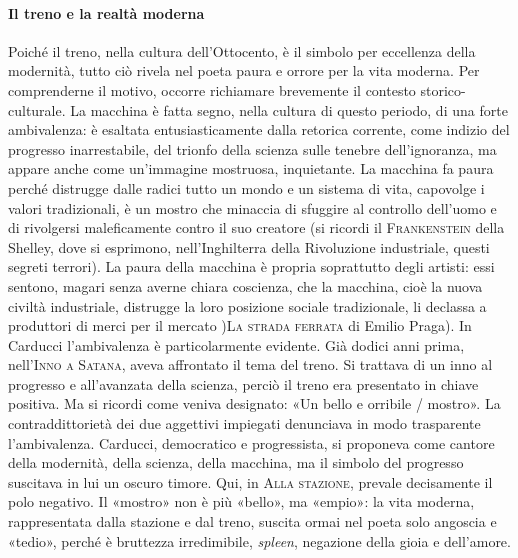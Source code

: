 \documentclass{book}
\newcounter{mar}
\begin{document}
\paragraph{Il treno e la realtà moderna} Poiché il treno, nella cultura dell'Ottocento, è il simbolo per eccellenza della modernità, tutto ciò rivela nel poeta paura e orrore per la vita moderna. Per comprenderne il motivo, occorre richiamare brevemente il contesto storico-culturale. La macchina è fatta segno, nella cultura di questo periodo, di una forte ambivalenza: è esaltata entusiasticamente dalla retorica corrente, come indizio del progresso inarrestabile, del trionfo della scienza sulle tenebre dell'ignoranza, ma appare anche come un'immagine mostruosa, inquietante. La macchina fa paura perché distrugge dalle radici tutto un mondo e un sistema di vita, capovolge i valori tradizionali, è un mostro che minaccia di sfuggire al controllo dell'uomo e di rivolgersi maleficamente contro il suo creatore (si ricordi il \textsc{Frankenstein} della Shelley, dove si esprimono, nell'Inghilterra della Rivoluzione industriale, questi segreti terrori). La paura della macchina è propria soprattutto degli artisti: essi sentono, magari senza averne chiara coscienza, che la macchina, cioè la nuova civiltà industriale, distrugge la loro posizione sociale tradizionale, li declassa a produttori di merci per il mercato )\textsc{La strada ferrata} di Emilio Praga). In Carducci l'ambivalenza è particolarmente evidente. Già dodici anni prima, nell'\textsc{Inno a Satana}, aveva affrontato il tema del treno. Si trattava di un inno al progresso e all'avanzata della scienza, perciò il treno era presentato in chiave positiva. Ma si ricordi come veniva designato: «Un bello e orribile / mostro». La contraddittorietà dei due aggettivi impiegati denunciava in modo trasparente l'ambivalenza. Carducci, democratico e progressista, si proponeva come cantore della modernità, della scienza, della macchina, ma il simbolo del progresso suscitava in lui un oscuro timore. Qui, in \textsc{Alla stazione}, prevale decisamente il polo negativo. Il «mostro» non è più «bello», ma «empio»: la vita moderna, rappresentata dalla stazione e dal treno, suscita ormai nel poeta solo angoscia e «tedio», perché è bruttezza irredimibile, \textit{spleen}, negazione della gioia e dell'amore.
\end{document}
